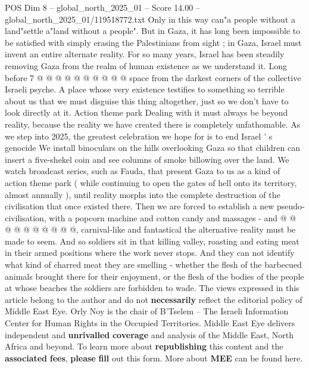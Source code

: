 \begin{textsample}{POS Dim 8 – global\_north\_2025\_01 – Score 14.00 – global\_north\_2025\_01/119518772.txt}
Only in this way can"a people without a land"settle a"land without a people".
But in Gaza, it has long been impossible to be satisfied with simply erasing the Palestinians from sight ; in Gaza, Israel must invent an entire alternate reality.
For so many years, Israel has been steadily removing Gaza from the realm of human existence as we understand it.
Long before 7 @ @ @ @ @ @ @ @ @ @ space from the darkest corners of the collective Israeli psyche.
A place whose very existence testifies to something so terrible about us that we must disguise this thing altogether, just so we don't have to look directly at it.
Action theme park Dealing with it must always be beyond reality, because the reality we have created there is completely unfathomable.
As we step into 2025, the greatest celebration we hope for is to end Israel ' s genocide We install binoculars on the hills overlooking Gaza so that children can insert a five-shekel coin and see columns of smoke billowing over the land.
We watch broadcast series, such as Fauda, that present Gaza to us as a kind of action theme park ( while continuing to open the gates of hell onto its territory, almost annually ), until reality morphs into the complete destruction of the civilisation that once existed there.
Then we are forced to establish a new pseudo-civilisation, with a popcorn machine and cotton candy and massages - and @ @ @ @ @ @ @ @ @ @, carnival-like and fantastical the alternative reality must be made to seem.
And so soldiers sit in that killing valley, roasting and eating meat in their armed positions where the work never stops.
And they can not identify what kind of charred meat they are smelling - whether the flesh of the barbecued animals brought there for their enjoyment, or the flesh of the bodies of the people at whose beaches the soldiers are forbidden to wade.
The views expressed in this article belong to the author and do not \textbf{necessarily} reflect the editorial policy of Middle East Eye.
Orly Noy is the chair of B'Tselem -- The Israeli Information Center for Human Rights in the Occupied Territories.
Middle East Eye delivers independent and \textbf{unrivalled} \textbf{coverage} and analysis of the Middle East, North Africa and beyond.
To learn more about \textbf{republishing} this content and the \textbf{associated} \textbf{fees}, \textbf{please} \textbf{fill} out this form.
More about \textbf{MEE} can be found here.

\end{textsample}
